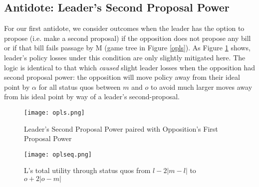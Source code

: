 \documentclass[12pt]{article}
\theoremstyle{plain}		      \newtheorem{assn}{Assumption}
\theoremstyle{plain}		      \newtheorem{prop}{Proposition}
\theoremstyle{plain}		      \newtheorem{lemma}{Lemma}
\theoremstyle{plain}	          \newtheorem{imp}{Implication}
\theoremstyle{plain}	          \newtheorem{hyp}{Hypothesis}
\theoremstyle{definition}		  \newtheorem{defn}{Definition}
\theoremstyle{remark}	          \newtheorem{rem}{Remark}
\theoremstyle{definition}         \newtheorem{case}{Case}
\begin{document}
\subsection{Antidote: Leader's Second Proposal Power}
\indent For our first antidote, we consider outcomes when the leader has the option to propose (i.e. make a second proposal) if the opposition does not propose any bill or if that bill fails passage by M (game tree in Figure \ref{opls}). As Figure \ref{oplseq} shows, leader's policy losses under this condition are only slightly mitigated here. The logic is identical to that which \textit{caused} slight leader losses when the opposition had second proposal power: the opposition will move policy away from their ideal point by $\alpha$ for all status quos between $m$ and $o$ to avoid much larger moves away from his ideal point by way of a leader's second-proposal. 
\begin{figure}[h]
  \centering
  \begin{minipage}[b]{0.3\textwidth}
    \texttt{[image: opls.png]}
    \caption{Leader's Second Proposal Power paired with Opposition's First Proposal Power}
    \label{opls}
  \end{minipage}
  \hfill
  \begin{minipage}[b]{0.6\textwidth}
    \texttt{[image: oplseq.png]}
    \caption{L's total utility through status quos from \newline $l-2|m-l|$ to $o+2|o-m|$}
    \label{oplseq}
  \end{minipage}
\end{figure}
\FloatBarrier
\end{document}
